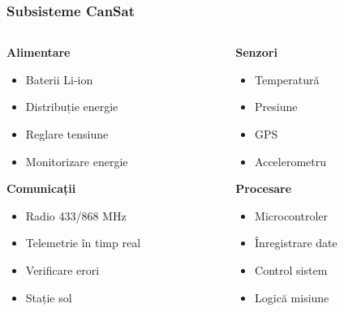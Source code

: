 \begin{frame}
\frametitle{Subsisteme CanSat}
\begin{columns}[T]
    \begin{column}{0.3\textwidth}
    \textbf{\textcolor{mainblue}{Alimentare}}
    \small
    \begin{itemize}
        \item Baterii Li-ion
        \item Distribuție energie
        \item Reglare tensiune
        \item Monitorizare energie
    \end{itemize}
    \vspace{0.3cm}
    \textbf{\textcolor{mainblue}{Comunicații}}
    \small
    \begin{itemize}
        \item Radio 433/868 MHz
        \item Telemetrie în timp real
        \item Verificare erori
        \item Stație sol
    \end{itemize}
    \end{column}
    
    \begin{column}{0.3\textwidth}
    \textbf{\textcolor{mainblue}{Senzori}}
    \small
    \begin{itemize}
        \item Temperatură
        \item Presiune
        \item GPS
        \item Accelerometru
    \end{itemize}
    \vspace{0.3cm}
    \textbf{\textcolor{mainblue}{Procesare}}
    \small
    \begin{itemize}
        \item Microcontroler
        \item Înregistrare date
        \item Control sistem
        \item Logică misiune
    \end{itemize}
    \end{column}
    

\end{columns}
\end{frame}
